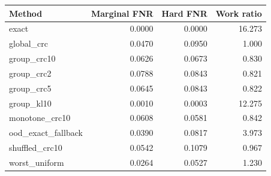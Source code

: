 \begin{tabular}{lrrr}
\hline
Method & Marginal FNR & Hard FNR & Work ratio \\
\hline
exact & 0.0000 & 0.0000 & 16.273 \\
global\_crc & 0.0470 & 0.0950 & 1.000 \\
group\_crc10 & 0.0626 & 0.0673 & 0.830 \\
group\_crc2 & 0.0788 & 0.0843 & 0.821 \\
group\_crc5 & 0.0645 & 0.0843 & 0.822 \\
group\_kl10 & 0.0010 & 0.0003 & 12.275 \\
monotone\_crc10 & 0.0608 & 0.0581 & 0.842 \\
ood\_exact\_fallback & 0.0390 & 0.0817 & 3.973 \\
shuffled\_crc10 & 0.0542 & 0.1079 & 0.967 \\
worst\_uniform & 0.0264 & 0.0527 & 1.230 \\
\hline
\end{tabular}
